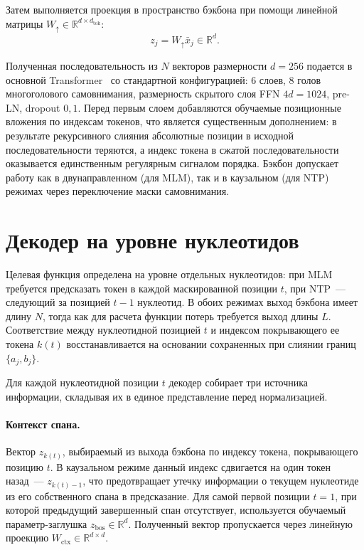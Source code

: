 Затем выполняется проекция в пространство бэкбона при помощи линейной
матрицы $W_{\uparrow} \in \mathbb{R}^{d \times d_{\text{tok}}}$:
\begin{equation}
  z_j = W_{\uparrow} \bar x_j \in \mathbb{R}^d.
\end{equation}

Полученная последовательность из $N$ векторов размерности $d = 256$
подается в основной Transformer~\cite{vaswaniAttentionAllYou2017} со
стандартной конфигурацией: 6 слоев, 8 голов многоголового самовнимания,
размерность скрытого слоя FFN $4d = 1024$, pre-LN, dropout $0{,}1$.
Перед первым слоем добавляются обучаемые позиционные вложения по
индексам токенов, что является существенным дополнением: в результате
рекурсивного слияния абсолютные позиции в исходной последовательности
теряются, а индекс токена в сжатой последовательности оказывается
единственным регулярным сигналом порядка. Бэкбон допускает работу как в
двунаправленном (для MLM), так и в каузальном (для NTP) режимах через
переключение маски самовнимания.

\section{Декодер на уровне нуклеотидов}

Целевая функция определена на уровне отдельных нуклеотидов: при MLM
требуется предсказать токен в каждой маскированной позиции $t$, при
NTP~--- следующий за позицией $t-1$ нуклеотид. В обоих режимах выход
бэкбона имеет длину $N$, тогда как для расчета функции потерь требуется
выход длины $L$. Соответствие между нуклеотидной позицией $t$ и
индексом покрывающего ее токена $k(t)$ восстанавливается на основании
сохраненных при слиянии границ $\{a_j, b_j\}$.

Для каждой нуклеотидной позиции $t$ декодер собирает три источника
информации, складывая их в единое представление перед нормализацией.

\paragraph{Контекст спана.} Вектор $z_{k(t)}$, выбираемый из выхода
бэкбона по индексу токена, покрывающего позицию $t$. В каузальном
режиме данный индекс сдвигается на один токен назад~--- $z_{k(t) - 1}$,
что предотвращает утечку информации о текущем нуклеотиде из его
собственного спана в предсказание. Для самой первой позиции $t = 1$,
при которой предыдущий завершенный спан отсутствует, используется
обучаемый параметр-заглушка $z_{\text{bos}} \in \mathbb{R}^d$.
Полученный вектор пропускается через линейную проекцию $W_{\text{ctx}}
\in \mathbb{R}^{d \times d}$.

